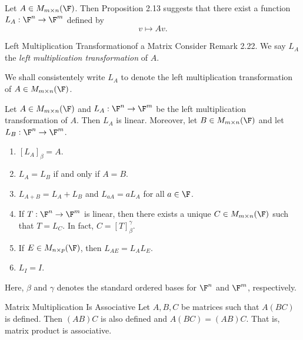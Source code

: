 \documentclass[linearalgebraI]{subfiles}
\begin{document}
    \begin{remark}
        Let $A\in M_{m\times n}(\F)$. Then Proposition 2.13 suggests that there exist a function $L_A:\F^n\to\F^m$ defined by
        \begin{equation*}
            v\mapsto Av.
        \end{equation*}
    \end{remark}

    \begin{definition}{Left Multiplication Transformation}{of a Matrix}
        Consider Remark 2.22. We say $L_A$ the \emph{left multiplication transformation} of $A$.
    \end{definition}

    \begin{remark}
        We shall consistentely write $L_A$ to denote the left multiplication transformation of $A\in M_{m\times n}(\F)$. 
    \end{remark}

    \begin{prop}{}
        Let $A\in M_{m\times n}(\F)$ and $L_A:\F^n\to\F^m$ be the left multiplication transformation of $A$. Then $L_A$ is linear. Moreover, let $B\in M_{m\times n}(\F)$ and let $L_B:\F^n\to\F^m$.  
        \begin{enumerate}
            \item $\left[ L_A \right] _\beta = A$.
            \item $L_A = L_B$ if and only if $A=B$.
            \item $L_{A+B} = L_A+L_B$ and $L_{aA} = aL_A$ for all $a\in\F$.
            \item If $T:\F^n\to\F^m$ is linear, then there exists a unique $C\in M_{m\times n}(\F)$ such that $T=L_C$. In fact, $C=\left[ T \right] ^\gamma_\beta$. 
            \item If $E\in M_{n\times p}(\F)$, then $L_{AE} = L_AL_E$.
            \item $L_I = I$.
        \end{enumerate}
        Here, $\beta$ and $\gamma$ denotes the standard ordered bases for $\F^n$ and $\F^m$, respectively.
    \end{prop}

    \clearpage
    \begin{prop}{Matrix Multiplication Is Associative}
        Let $A, B, C$ be matrices such that $A(BC)$ is defined. Then $(AB)C$ is also defined and $A(BC) = (AB)C$. That is, matrix product is associative.
    \end{prop}
\end{document}
